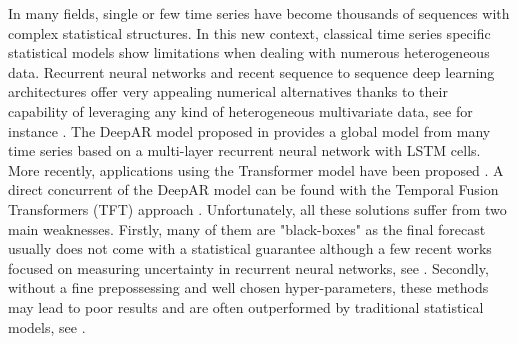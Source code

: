\documentclass{article} %
\begin{document}

In many fields, single or few time series have become thousands of sequences with complex statistical structures. In this new context, classical time series specific statistical models show limitations when dealing with numerous heterogeneous data. Recurrent neural networks and recent sequence to sequence deep learning architectures offer very appealing numerical alternatives thanks to their capability of leveraging any kind of heterogeneous multivariate data, see for instance \citep{ hochreiter1997long,vaswani2017attention, 8614252, li2019enhancing, lim2019temporal,salinas2020deepar}. %
The DeepAR model proposed in \citep{salinas2020deepar} provides a global model from many time series based on
a multi-layer recurrent neural network with LSTM cells. More recently, applications using the Transformer model have been proposed  \citep{li2019enhancing}. A direct concurrent of the DeepAR model can be found with the Temporal Fusion Transformers (TFT) approach \citep{lim2019temporal}.  Unfortunately, all these solutions suffer from two main weaknesses. Firstly, many of them are "black-boxes"  as the final forecast usually does not come with a statistical guarantee  although a few recent works focused on measuring uncertainty in recurrent neural networks, see  \cite{martin2020monte}. Secondly, without a fine prepossessing and well chosen hyper-parameters, these methods may lead to poor results and are often outperformed by traditional statistical models, see \cite{makridakis2018m4}.
\end{document}
